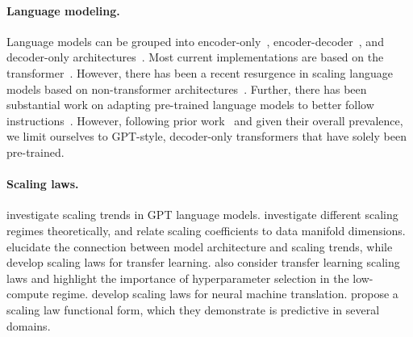 \begin{appendix}
\paragraph{Language modeling.}
Language models can be grouped into encoder-only~\cite{devlin-etal-2019-bert,albert,roberta,Sanh2019DistilBERTAD,clark2020electra}, encoder-decoder~\cite{lewis-etal-2020-bart,raffel2020exploring}, and decoder-only architectures~\cite{Radford2019LanguageMA,llama,llama2,MosaicML2023Introducing,jiang2023mistral,gunasekar2023textbooks,XGen,artetxe-etal-2022-efficient,thoppilan2022lamda,du2022glam,luukkonen2023fingpt,scao2022language,workshop2022bloom,allal2023santacoder,li2023starcoder,lozhkov2024starcoder,groeneveld2024olmo}.
Most current implementations are based on the transformer~\cite{transformer}. However, there has been a recent resurgence in scaling language models based on non-transformer architectures~\cite{peng-etal-2023-rwkv,gu2021combining,gu2021efficiently,mamba}.
Further, there has been substantial work on adapting pre-trained language models to better follow instructions~\cite{wei2021finetuned,chung2022scaling,muennighoff2022crosslingual,longpre2023data,muennighoff2023octopack,zhuo2024astraios,rafailov2024direct,ethayarajh2024kto,ustun2024aya,singh2024aya,muennighoff2024generative}.
However, following prior work~\cite{chinchilla,muennighoff2023scaling} and given their overall prevalence, we limit ourselves to GPT-style, decoder-only transformers that have solely been pre-trained.

\paragraph{Scaling laws.}
\citet{kaplan2020scaling} investigate scaling trends in GPT language models. 
\citet{bahri2021explaining} investigate different scaling regimes theoretically, and \citet{sharma_ScalingLawsData_2022} relate scaling coefficients to data manifold dimensions.
\citet{tay2021scale,tay-etal-2023-scaling} elucidate the connection between model architecture and scaling trends, while \citet{Hernandez2021ScalingLF,tay2021scale} develop scaling laws for transfer learning.
\citet{ivgi2022scaling} also consider transfer learning scaling laws and highlight the importance of hyperparameter selection in the low-compute regime.
\citet{ghorbani2021scaling,gordon-etal-2021-data,bansal2022data} develop scaling laws for neural machine translation.
\citet{caballero2023broken} propose a scaling law functional form, which they demonstrate is predictive in several domains.


\end{appendix}
